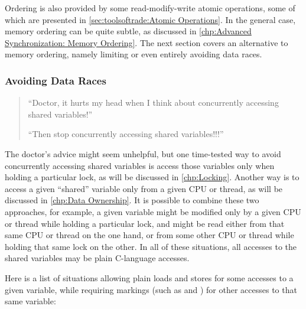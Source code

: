 Ordering is also provided by some read-modify-write atomic
operations, some of which are presented in
\cref{sec:toolsoftrade:Atomic Operations}.
In the general case, memory ordering can be quite subtle, as
discussed in
\cref{chp:Advanced Synchronization: Memory Ordering}.
The next section covers an alternative to memory ordering, namely
limiting or even entirely avoiding data races.

\subsubsection{Avoiding Data Races}
\label{sec:toolsoftrade:Avoiding Data Races}

\begin{quote}
``Doctor, it hurts my head when I think about concurrently accessing
shared variables!''

``Then stop concurrently accessing shared variables!!!''
\end{quote}

The doctor's advice might seem unhelpful, but
one time-tested way to avoid concurrently accessing shared variables
is access those variables only when holding a particular lock, as will
be discussed in \cref{chp:Locking}.
Another way is to access a given ``shared'' variable only from a given
CPU or thread, as will be discussed in
\cref{chp:Data Ownership}.
It is possible to combine these two approaches, for example, a given
variable might be modified only by a given CPU or thread while holding a
particular lock, and might be read either from that same CPU or thread
on the one hand, or from some other CPU or thread while holding that
same lock on the other.
In all of these situations, all accesses to the shared variables may
be plain C-language accesses.

Here is a list of situations
allowing plain loads and stores for some accesses to a given variable,
while requiring markings (such as  and )
for other accesses to that same variable:

